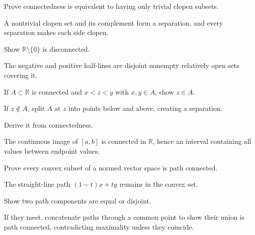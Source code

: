 \begin{problem}\label{prob:ii07-problem-01}
Prove connectedness is equivalent to having only trivial clopen subsets.
\end{problem}
\begin{solution}
A nontrivial clopen set and its complement form a separation, and every separation makes each side clopen.
\end{solution}

\begin{problem}\label{prob:ii07-problem-02}
Show $\mathbb R\setminus\{0\}$ is disconnected.
\end{problem}
\begin{solution}
The negative and positive half-lines are disjoint nonempty relatively open sets covering it.
\end{solution}

\begin{problem}\label{prob:ii07-problem-03}
If $A\subset\mathbb R$ is connected and $x<z<y$ with $x,y\in A$, show $z\in A$.
\end{problem}
\begin{solution}
If $z\notin A$, split $A$ at $z$ into points below and above, creating a separation.
\end{solution}

\begin{problem}\label{prob:ii07-problem-04}
Derive it from connectedness.
\end{problem}
\begin{solution}
The continuous image of $[a,b]$ is connected in $\mathbb R$, hence an interval containing all values between endpoint values.
\end{solution}

\begin{problem}\label{prob:ii07-problem-05}
Prove every convex subset of a normed vector space is path connected.
\end{problem}
\begin{solution}
The straight-line path $(1-t)x+ty$ remains in the convex set.
\end{solution}

\begin{problem}\label{prob:ii07-problem-06}
Show two path components are equal or disjoint.
\end{problem}
\begin{solution}
If they meet, concatenate paths through a common point to show their union is path connected, contradicting maximality unless they coincide.
\end{solution}

